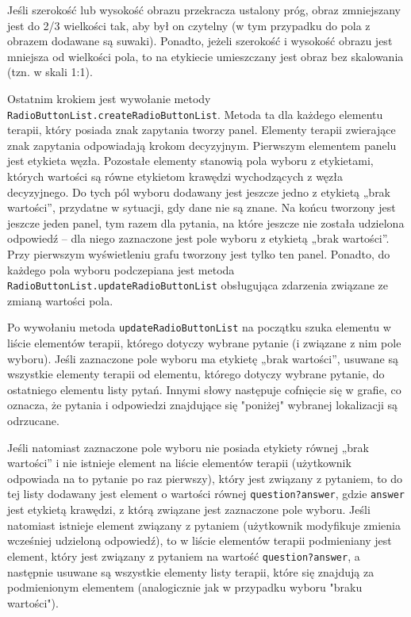 Jeśli szerokość lub wysokość obrazu przekracza ustalony próg, obraz zmniejszany jest do 2/3 wielkości tak, aby był on czytelny (w tym przypadku do pola z obrazem dodawane są suwaki). Ponadto, jeżeli szerokość i wysokość obrazu jest mniejsza od wielkości pola, to na etykiecie umieszczany jest obraz bez skalowania (tzn. w skali 1:1).
 
Ostatnim krokiem jest wywołanie metody \texttt{RadioButtonList.createRadioButtonList}. Metoda ta dla każdego elementu terapii, który posiada znak zapytania tworzy panel. Elementy terapii zwierające znak zapytania odpowiadają krokom decyzyjnym. Pierwszym elementem panelu jest etykieta węzła. Pozostałe elementy stanowią pola wyboru z etykietami, których wartości są równe etykietom krawędzi wychodzących z węzła decyzyjnego. Do tych pól wyboru dodawany jest jeszcze jedno z etykietą „brak wartości”, przydatne w sytuacji, gdy dane nie są znane. Na końcu tworzony jest jeszcze jeden panel, tym razem dla pytania, na które jeszcze nie została udzielona odpowiedź -- dla niego zaznaczone jest pole wyboru z etykietą „brak wartości”. Przy pierwszym wyświetleniu grafu tworzony jest tylko ten panel. Ponadto, do każdego pola wyboru podczepiana jest metoda \texttt{RadioButtonList.updateRadioButtonList} obsługująca zdarzenia związane ze zmianą wartości pola.

Po wywołaniu metoda \texttt{updateRadioButtonList} na początku szuka elementu w liście elementów terapii, którego dotyczy wybrane pytanie (i związane z nim pole wyboru). Jeśli zaznaczone pole wyboru ma etykietę „brak wartości”, usuwane są wszystkie elementy terapii od elementu, którego dotyczy wybrane pytanie, do ostatniego elementu listy pytań. Innymi słowy następuje cofnięcie się w grafie, co oznacza, że pytania i odpowiedzi znajdujące się "poniżej" wybranej lokalizacji są odrzucane.

Jeśli natomiast zaznaczone pole wyboru nie posiada etykiety równej „brak wartości” i nie istnieje element na liście elementów terapii (użytkownik odpowiada na to pytanie po raz pierwszy), który jest związany z pytaniem, to do tej listy dodawany jest element o wartości równej \texttt{question?answer}, gdzie \texttt{answer} jest etykietą krawędzi, z którą związane jest zaznaczone pole wyboru.  Jeśli natomiast istnieje element związany z pytaniem (użytkownik modyfikuje zmienia wcześniej udzieloną odpowiedź), to w liście elementów terapii podmieniany jest element, który jest związany z pytaniem na wartość \texttt{question?answer}, a następnie usuwane są wszystkie elementy listy terapii, które się znajdują za podmienionym elementem (analogicznie jak w przypadku wyboru "braku wartości"). 

